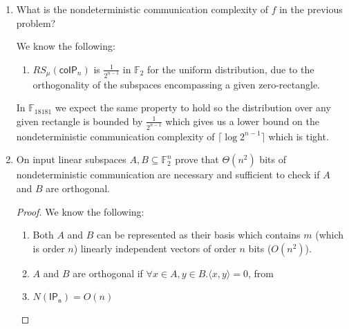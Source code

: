 \documentclass[usletter]{article}
\begin{document}
\begin{enumerate}
    \begin{proof}
      We know the following:

      \begin{enumerate}
        \item $rk_{\mathbb{F}_2}\ M_{\mathsf{coIP}_n} = n$
        \item $\forall \mathbb{F}, \mathbb{K}, rk_{\mathbb{F}}\ M = rk_{\mathbb{K}}\ M$ where $\mathbb{F}, \mathbb{K}$ are finite fields.
        \item $\forall \mathbb{F}, f.|fs(f)| \leq (1 + rk_{\mathbb{F}}\ M_f)^2$ where $M_f$ is the characteristic matrix for $f$.
      \end{enumerate}

      From the definition and (a) $f$ has can be seen as $\mathsf{coIP}_n$ in $\mathbb{F}_{18181}$. Then by (b) and (c) we know that $M_f$ has rank $n$ and taken with (d) this implies that the size of the fooling set is certainly no greater than $n^3$.
    \end{proof}

  \item What is the nondeterministic communication complexity of $f$ in the previous problem?

    We know the following:

    \begin{enumerate}
      \item $RS_{\mu}(\mathsf{coIP}_n)$ is $\frac{1}{2^{n-1}}$ in $\mathbb{F}_2$ for the uniform distribution, due to the orthogonality of the subspaces encompassing a given zero-rectangle.
    \end{enumerate}

    In $\mathbb{F}_{18181}$ we expect the same property to hold so the distribution over any given rectangle is bounded by $\frac{1}{2^{n-1}}$ which gives us a lower bound on the nondeterministic communication complexity of $\lceil \log 2^{n-1} \rceil $ which is tight.

  \item On input linear subspaces $A, B \subseteq \mathbb{F}_2^n$ prove that $\Theta(n^2)$ bits of nondeterministic communication are necessary and sufficient to check if $A$ and $B$ are orthogonal.

    \begin{proof}
      We know the following:

      \begin{enumerate}
        \item Both $A$ and $B$ can be represented as their basis which contains $m$ (which is order $n$) linearly independent vectors of order $n$ bits ($O(n^2)$).
        \item $A$ and $B$ are orthogonal if $\forall x \in A, y \in B. \langle x, y \rangle = 0$, from \cite{orthsub}
        \item $N(\mathsf{IP_n}) = O(n)$
      \end{enumerate}


\end{proof}
\end{enumerate}
\end{document}
